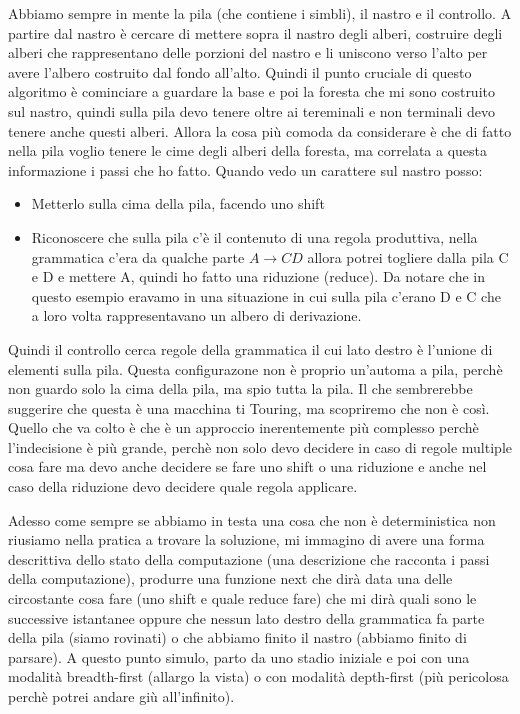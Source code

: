 Abbiamo sempre in mente la pila (che contiene i simbli), il nastro e il controllo. A partire dal nastro è cercare di mettere sopra il nastro degli alberi, costruire degli alberi che rappresentano delle porzioni del nastro e li uniscono verso l'alto per avere l'albero costruito dal fondo all'alto. Quindi il punto cruciale di questo algoritmo è cominciare a guardare la base e poi la foresta che mi sono costruito sul nastro, quindi sulla pila devo tenere oltre ai tereminali e non terminali devo tenere anche questi alberi.
Allora la cosa più comoda da considerare è che di fatto nella pila voglio tenere le cime degli alberi della foresta, ma correlata a questa informazione i passi che ho fatto.
Quando vedo un carattere sul nastro posso:
\begin{itemize}
  \item Metterlo sulla cima della pila, facendo uno shift
  \item Riconoscere che sulla pila c'è il contenuto di una regola produttiva, nella grammatica c'era da qualche parte $A \rightarrow CD$ allora potrei togliere dalla pila C e D e mettere A, quindi ho fatto una riduzione (reduce). Da notare che in questo esempio eravamo in una situazione in cui sulla pila c'erano D e C che a loro volta rappresentavano un albero di derivazione.
\end{itemize}

Quindi il controllo cerca regole della grammatica il cui lato destro è l'unione di elementi sulla pila. Questa configurazone non è proprio un'automa a pila, perchè non guardo solo la cima della pila, ma spio tutta la pila. Il che sembrerebbe suggerire che questa è una macchina ti Touring, ma scopriremo che non è così. Quello che va colto è che è un approccio inerentemente più complesso perchè l'indecisione è più grande, perchè non solo devo decidere in caso di regole multiple cosa fare ma devo anche decidere se fare uno shift o una riduzione e anche nel caso della riduzione devo decidere quale regola applicare.

Adesso come sempre se abbiamo in testa una cosa che non è deterministica non riusiamo nella pratica a trovare la soluzione, mi immagino di avere una forma descrittiva dello stato della computazione (una descrizione che racconta i passi della computazione), produrre una funzione next che dirà data una delle circostante cosa fare (uno shift e quale reduce fare) che mi dirà quali sono le successive istantanee oppure che nessun lato destro della grammatica fa parte della pila (siamo rovinati) o che abbiamo finito il nastro (abbiamo finito di parsare).
A questo punto simulo, parto da uno stadio iniziale e poi con una modalità breadth-first (allargo la vista) o con modalità depth-first (più pericolosa perchè potrei andare giù all'infinito).

